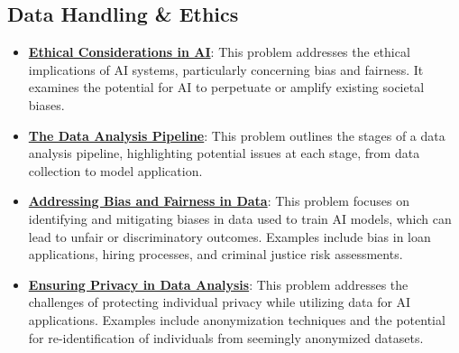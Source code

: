\documentclass{article}%
\begin{document}
\subsection{Data Handling \& Ethics}%
\label{subsec:DataHandlingEthics}%
\begin{itemize}[leftmargin=*]%
\item \href{https://purdue.brightspace.com/d2l/common/assets/pdfjs-d2l-dist/1.0.14-legacy/web/viewer.html?file=\%2Fcontent\%2Fenforced\%2F1095467-wl.202510.CS.24300.001\%2F02L2-Intro.pdf\%3Fou\%3D1095467\&lang=en-us\&container=d2l-fileviewer-rendered-pdf\&fullscreen=d2l-fileviewer-rendered-pdf-dialog\&height=667#page=20}{\textbf{Ethical Considerations in AI}}: This problem addresses the ethical implications of AI systems, particularly concerning bias and fairness. It examines the potential for AI to perpetuate or amplify existing societal biases.%
\item \href{https://purdue.brightspace.com/d2l/common/assets/pdfjs-d2l-dist/1.0.14-legacy/web/viewer.html?file=\%2Fcontent\%2Fenforced\%2F1095467-wl.202510.CS.24300.001\%2F10L1-CrossValidation.pdf\%3Fou\%3D1095467\&lang=en-us\&container=d2l-fileviewer-rendered-pdf\&fullscreen=d2l-fileviewer-rendered-pdf-dialog\&height=667#page=26}{\textbf{The Data Analysis Pipeline}}: This problem outlines the stages of a data analysis pipeline, highlighting potential issues at each stage, from data collection to model application.%
\item \href{https://purdue.brightspace.com/d2l/common/assets/pdfjs-d2l-dist/1.0.14-legacy/web/viewer.html?file=\%2Fcontent\%2Fenforced\%2F1095467-wl.202510.CS.24300.001\%2F16L2-ethics.pdf\%3Fou\%3D1095467\&lang=en-us\&container=d2l-fileviewer-rendered-pdf\&fullscreen=d2l-fileviewer-rendered-pdf-dialog\&height=667#page=2}{\textbf{Addressing Bias and Fairness in Data}}: This problem focuses on identifying and mitigating biases in data used to train AI models, which can lead to unfair or discriminatory outcomes. Examples include bias in loan applications, hiring processes, and criminal justice risk assessments.%
\item \href{https://purdue.brightspace.com/d2l/common/assets/pdfjs-d2l-dist/1.0.14-legacy/web/viewer.html?file=\%2Fcontent\%2Fenforced\%2F1095467-wl.202510.CS.24300.001\%2F16L2-ethics.pdf\%3Fou\%3D1095467\&lang=en-us\&container=d2l-fileviewer-rendered-pdf\&fullscreen=d2l-fileviewer-rendered-pdf-dialog\&height=667#page=10}{\textbf{Ensuring Privacy in Data Analysis}}: This problem addresses the challenges of protecting individual privacy while utilizing data for AI applications. Examples include anonymization techniques and the potential for re-identification of individuals from seemingly anonymized datasets.%

\end{itemize}
\end{document}
